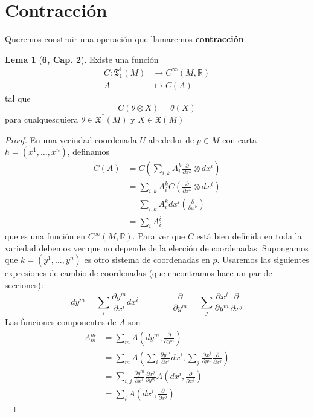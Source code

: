 \documentclass[spanish]{book}
\theoremstyle{definition}
\newtheorem*{lema}{Lema}
\newcommand{\R}{\mathbb{R}}
\newcommand{\X}{\mathfrak{X}}
\newcommand{\T}{\mathfrak{T}}
\newcommand{\Cinf}{C^\infty}
\begin{document}
	\section{Contracción}
	Queremos construir una operación que llamaremos \textbf{contracción}. 
	
	\begin{lema}[\cite{ONeill}\textbf{6, Cap. 2}]
		Existe una función
		\begin{align*}
			C:\T^1_1(M)&\to \Cinf(M,\R)\\
			A&\mapsto C(A)
		\end{align*}
		tal que
		\[C(\theta\otimes X)=\theta(X)\]
		para cualquesquiera $\theta\in\X^*(M)$ y $X\in\X(M)$
	\end{lema}
	\begin{proof}
		En una vecindad coordenada $U$ alrededor de $p\in M$ con carta $h=(x^1,\ldots,x^n)$, definamos
		\begin{align*}
			C(A)&=C\left(\sum_{i,k}A_i^k\frac{\partial}{\partial x^k}\otimes dx^i\right)\\
			&=\sum_{i,k}A_i^kC\left(\frac{\partial}{\partial x^k}\otimes dx^i\right)\\
			&=\sum_{i,k}A_i^kdx^i\left(\frac{\partial}{\partial x^k}\right)\\
			&=\sum_iA^i_i
		\end{align*}
		que es una función en $\Cinf(M,\R)$. Para ver que $C$ está bien definida en toda la variedad debemos ver que no depende de la elección de coordenadas. Supongamos que $k=(y^1,\ldots,y^n)$ es otro sistema de coordenadas en $p$. Usaremos las siguientes expresiones de cambio de coordenadas (que encontramos hace un par de secciones):
		\[dy^m=\sum_ i\frac{\partial y^m}{\partial x^i}dx^i\qquad\qquad\frac{\partial}{\partial y^m}=\sum_j\frac{\partial x^j}{\partial y^m}\frac{\partial}{\partial x^j}\]
		Las funciones componentes de $A$ son
		\begin{align*}
			A^m_m&=\sum_mA\left(dy^m,\frac{\partial}{\partial y^m}\right)\\
			&=\sum_mA\left(\sum_ i\frac{\partial y^m}{\partial x^i}dx^i,\sum_j\frac{\partial x^j}{\partial y^m}\frac{\partial}{\partial x^j}\right)\\
			&=\sum_{i,j}\frac{\partial y^m}{\partial x^i}\frac{\partial x^j}{\partial y^m}A\left(dx^i,\frac{\partial}{\partial x^j}\right)\\
			&=\sum_iA\left(dx^i,\frac{\partial}{\partial x^j}\right)
		\end{align*}
		
	\end{proof}
	
\end{document}
